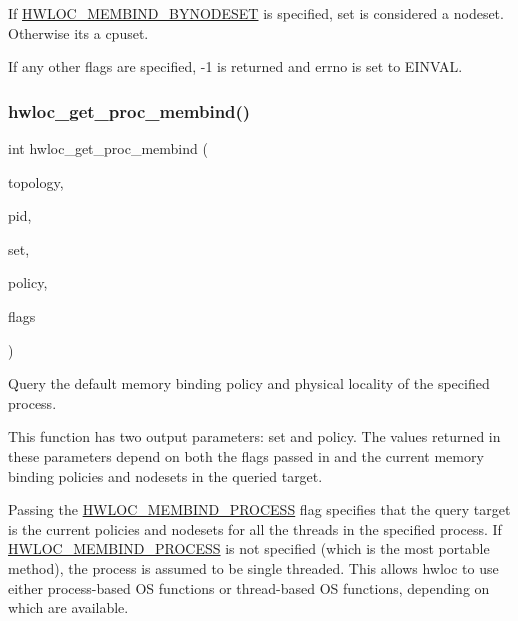 If \hyperlink{a00191_ggab00475fd98815bf4fb9aaf752030e7d2a71f19fe4505f1c083dc8e6f7bdea6256}{H\+W\+L\+O\+C\+\_\+\+M\+E\+M\+B\+I\+N\+D\+\_\+\+B\+Y\+N\+O\+D\+E\+S\+ET} is specified, set is considered a nodeset. Otherwise it\textquotesingle{}s a cpuset.

If any other flags are specified, -\/1 is returned and errno is set to E\+I\+N\+V\+AL. \mbox{\label{a00191_ga1730ceb18ec6ee3b7bd3d0db81f07dc8}} 
\subsubsection{\texorpdfstring{hwloc\+\_\+get\+\_\+proc\+\_\+membind()}{hwloc\_get\_proc\_membind()}}
{\footnotesize\ttfamily int hwloc\+\_\+get\+\_\+proc\+\_\+membind (\begin{DoxyParamCaption}\item[{\hyperlink{a00186_ga9d1e76ee15a7dee158b786c30b6a6e38}{hwloc\+\_\+topology\+\_\+t}}]{topology,  }\item[{hwloc\+\_\+pid\+\_\+t}]{pid,  }\item[{\hyperlink{a00205_gaa3c2bf4c776d603dcebbb61b0c923d84}{hwloc\+\_\+bitmap\+\_\+t}}]{set,  }\item[{\hyperlink{a00191_gac9764f79505775d06407b40f5e4661e8}{hwloc\+\_\+membind\+\_\+policy\+\_\+t} $\ast$}]{policy,  }\item[{int}]{flags }\end{DoxyParamCaption})}



Query the default memory binding policy and physical locality of the specified process. 

This function has two output parameters\+: {\ttfamily set} and {\ttfamily policy}. The values returned in these parameters depend on both the {\ttfamily flags} passed in and the current memory binding policies and nodesets in the queried target.

Passing the \hyperlink{a00191_ggab00475fd98815bf4fb9aaf752030e7d2a1b1b74aef138f64aff214a8cbdfe8eb4}{H\+W\+L\+O\+C\+\_\+\+M\+E\+M\+B\+I\+N\+D\+\_\+\+P\+R\+O\+C\+E\+SS} flag specifies that the query target is the current policies and nodesets for all the threads in the specified process. If \hyperlink{a00191_ggab00475fd98815bf4fb9aaf752030e7d2a1b1b74aef138f64aff214a8cbdfe8eb4}{H\+W\+L\+O\+C\+\_\+\+M\+E\+M\+B\+I\+N\+D\+\_\+\+P\+R\+O\+C\+E\+SS} is not specified (which is the most portable method), the process is assumed to be single threaded. This allows hwloc to use either process-\/based OS functions or thread-\/based OS functions, depending on which are available.

